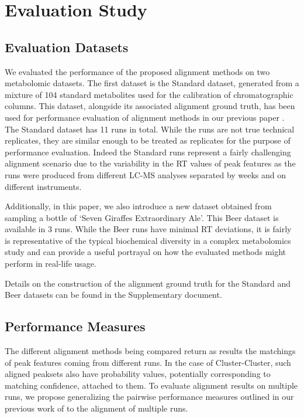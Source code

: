 \section{Evaluation Study}

\subsection{Evaluation Datasets}

We evaluated the performance of the proposed alignment methods on two metabolomic datasets. The first dataset is the Standard dataset, generated from a mixture of 104 standard metabolites used for the calibration of chromatographic columns. This dataset, alongside its associated alignment ground truth, has been used for performance evaluation of alignment methods in our previous paper \cite{Wandy2015}. The Standard dataset has 11 runs in total. While the runs are not true technical replicates, they are similar enough to be treated as replicates for the purpose of performance evaluation. Indeed the Standard runs represent a fairly challenging alignment scenario due to the variability in the RT values of peak features as the runs were produced from different LC-MS analyses separated by weeks and on different instruments.

Additionally, in this paper, we also introduce a new dataset obtained from sampling a bottle of `Seven Giraffes Extraordinary Ale'. This Beer dataset is available in 3 runs. While the Beer runs have minimal RT deviations, it is fairly is representative of the typical biochemical diversity in a complex metabolomics study and can provide a useful portrayal on how the evaluated methods might perform in real-life usage.

Details on the construction of the alignment ground truth for the Standard and Beer datasets can be found in the Supplementary document.

\subsection{Performance Measures}

The different alignment methods being compared return as results the matchings of peak features coming from different runs. In the case of Cluster-Cluster, such aligned peaksets also have probability values, potentially corresponding to matching confidence, attached to them. To evaluate alignment results on multiple runs, we propose generalizing the pairwise performance measures outlined in our previous work of \cite{Wandy2015} to the alignment of multiple runs. 

